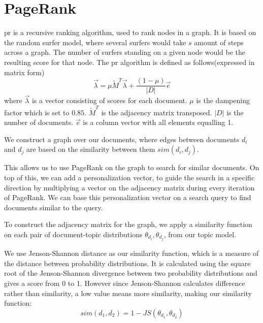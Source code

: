 \section{PageRank}\label{sec:pagerank}
\gls{pr} is a recursive ranking algorithm, used to rank nodes in a graph.
It is based on the random surfer model, where several surfers would take $s$ amount of steps across a graph.
The number of surfers standing on a given node would be the resulting score for that node.
The \gls{pr} algorithm is defined as follows(expressed in matrix form)
$$ \overrightarrow{\lambda} = \mu \widetilde{M}^T \overrightarrow{\lambda} + \frac{(1-\mu)}{|D|} \overrightarrow{e} $$  
where $\overrightarrow{\lambda}$ is a vector consisting of scores for each document. 
$\mu$ is the dampening factor which is set to $0.85$.
$\widetilde{M}^T$ is the adjacency matrix transposed.
$|D|$ is the number of documents.
$\overrightarrow{e}$ is a column vector with all elements equalling 1.

We construct a graph over our documents, where edges between documents $d_i$ and $d_j$ are based on the similarity between them $sim(d_i, d_j)$.

This allows us to use PageRank on the graph to search for similar documents.
On top of this, we can add a personalization vector, to guide the search in a specific direction by multiplying a vector on the adjacency matrix during every iteration of PageRank.
We can base this personalization vector on a search query to find documents similar to the query.

To construct the adjacency matrix for the graph, we apply a similarity function on each pair of document-topic distributions $\theta_{d_i}, \theta_{d_j}$, from our topic model.

We use Jenson-Shannon distance as our similarity function, which is a measure of the distance between probability distributions\cite{jensen-shannon2003}\cite{jensen-shannondis2003}.
It is calculated using the square root of the Jenson-Shannon divergence between two probability distributions and gives a score from 0 to 1.
However since Jenson-Shannon calculates difference rather than similarity, a low value means more similarity, making our similarity function:
$$sim(d_1, d_2) = 1 - JS(\theta_{d_1}, \theta_{d_2})$$


